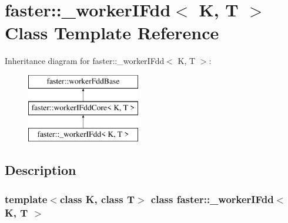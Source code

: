 \hypertarget{classfaster_1_1__workerIFdd}{}\section{faster\+:\+:\+\_\+worker\+I\+Fdd$<$ K, T $>$ Class Template Reference}
\label{classfaster_1_1__workerIFdd}
Inheritance diagram for faster\+:\+:\+\_\+worker\+I\+Fdd$<$ K, T $>$\+:\begin{figure}[H]
\begin{center}
\leavevmode
\includegraphics[height=3.000000cm]{classfaster_1_1__workerIFdd}
\end{center}
\end{figure}


\subsection{Description}
\subsubsection*{template$<$class K, class T$>$\newline
class faster\+::\+\_\+worker\+I\+Fdd$<$ K, T $>$}

